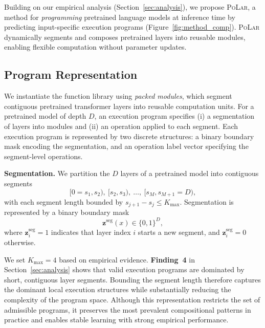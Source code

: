 \documentclass{article}
\theoremstyle{plain}
\theoremstyle{definition}
\theoremstyle{remark}
\newcommand\ours{\textsc{PoLar}\xspace}
\begin{document}
Building on our empirical analysis (Section~\ref{sec:analysis}), we propose \ours, a method for \emph{programming} pretrained language models at inference time by predicting input-specific execution programs (Figure~\ref{fig:method_comp}).
\ours dynamically segments and composes pretrained layers into reusable modules, enabling flexible computation without parameter updates.

\subsection{Program Representation}
\label{sec:prog-repr}

We instantiate the function library using \emph{packed modules}, which segment contiguous pretrained transformer layers into reusable computation units.
For a pretrained model of depth $D$, an execution program specifies (i) a segmentation of layers into modules and (ii) an operation applied to each segment.
Each execution program is represented by two discrete structures: a binary boundary mask encoding the segmentation, and an operation label vector specifying the segment-level operations.


\textbf{Segmentation.}
We partition the $D$ layers of a pretrained model into contiguous segments
\begingroup
\setlength{\abovedisplayskip}{2pt}
\setlength{\belowdisplayskip}{2pt}
\[
\textstyle
[0=s_1, s_2),\ [s_2, s_3),\ \ldots,\ [s_M, s_{M+1}=D),
\]
\endgroup
with each segment length bounded by $s_{j+1}-s_j \le K_{\max}$.
Segmentation is represented by a binary boundary mask
\begingroup
\setlength{\abovedisplayskip}{2pt}
\setlength{\belowdisplayskip}{2pt}
\[
\textstyle
\mathbf{z}^{\text{seg}}(x)\in\{0,1\}^D,
\]
\endgroup
where $\mathbf{z}^{\text{seg}}_i=1$ indicates that layer index $i$ starts a new segment,
and $\mathbf{z}^{\text{seg}}_i=0$ otherwise.

We set $K_{\max}=4$ based on empirical evidence.
\textbf{Finding~4} in Section~\ref{sec:analysis} shows that valid execution programs
are dominated by short, contiguous layer segments.
Bounding the segment length therefore captures the dominant local execution
structures while substantially reducing the complexity of the program space.
Although this representation restricts the set of admissible programs,
it preserves the most prevalent compositional patterns in practice
and enables stable learning with strong empirical performance.
\end{document}
